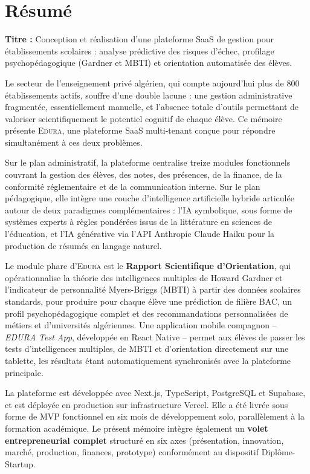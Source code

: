 \documentclass[12pt,a4paper,oneside]{report}
\newcommand{\edura}{\textsc{Edura}}
\begin{document}
\chapter*{Résumé}
\thispagestyle{plain}

\noindent\textbf{Titre :} Conception et réalisation d'une plateforme SaaS de gestion pour établissements scolaires : analyse prédictive des risques d'échec, profilage psychopédagogique (Gardner et MBTI) et orientation automatisée des élèves.

\vspace{8pt}

Le secteur de l'enseignement privé algérien, qui compte aujourd'hui plus de 800 établissements actifs, souffre d'une double lacune : une gestion administrative fragmentée, essentiellement manuelle, et l'absence totale d'outils permettant de valoriser scientifiquement le potentiel cognitif de chaque élève. Ce mémoire présente \edura{}, une plateforme SaaS multi-tenant conçue pour répondre simultanément à ces deux problèmes.

Sur le plan administratif, la plateforme centralise treize modules fonctionnels couvrant la gestion des élèves, des notes, des présences, de la finance, de la conformité réglementaire et de la communication interne. Sur le plan pédagogique, elle intègre une couche d'intelligence artificielle hybride articulée autour de deux paradigmes complémentaires : l'IA symbolique, sous forme de systèmes experts à règles pondérées issus de la littérature en sciences de l'éducation, et l'IA générative via l'API Anthropic Claude Haiku pour la production de résumés en langage naturel.

Le module phare d'\edura{} est le \textbf{Rapport Scientifique d'Orientation}, qui opérationnalise la théorie des intelligences multiples de Howard Gardner \autocite{gardner1983frames} et l'indicateur de personnalité Myers-Briggs (MBTI) \autocite{myers1980gifts} à partir des données scolaires standards, pour produire pour chaque élève une prédiction de filière BAC, un profil psychopédagogique complet et des recommandations personnalisées de métiers et d'universités algériennes. Une application mobile compagnon -- \textit{EDURA Test App}, développée en React Native -- permet aux élèves de passer les tests d'intelligences multiples, de MBTI et d'orientation directement sur une tablette, les résultats étant automatiquement synchronisés avec la plateforme principale.

La plateforme est développée avec Next.js, TypeScript, PostgreSQL et Supabase, et est déployée en production sur infrastructure Vercel. Elle a été livrée sous forme de MVP fonctionnel en six mois de développement solo, parallèlement à la formation académique. Le présent mémoire intègre également un \textbf{volet entrepreneurial complet} structuré en six axes (présentation, innovation, marché, production, finances, prototype) conformément au dispositif Diplôme-Startup.
\end{document}

